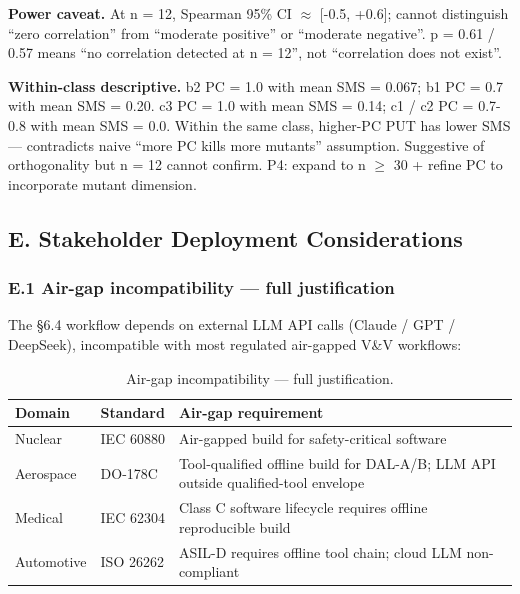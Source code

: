 \documentclass[review,12pt,authoryear]{elsarticle}
\begin{document}
\textbf{Power caveat.} At n = 12, Spearman 95\% CI $\approx$ {[}-0.5, +0.6{]};
cannot distinguish ``zero correlation'' from ``moderate positive'' or
``moderate negative''. p = 0.61 / 0.57 means ``no correlation detected
at n = 12'', not ``correlation does not exist''.

\textbf{Within-class descriptive.} b2 PC = 1.0 with mean SMS = 0.067; b1
PC = 0.7 with mean SMS = 0.20. c3 PC = 1.0 with mean SMS = 0.14; c1 / c2
PC = 0.7-0.8 with mean SMS = 0.0. Within the same class, higher-PC PUT
has lower SMS --- contradicts naive ``more PC kills more mutants''
assumption. Suggestive of orthogonality but n = 12 cannot confirm. P4:
expand to n $\geq$ 30 + refine PC to incorporate mutant dimension.


\subsection{E. Stakeholder Deployment Considerations}\label{e.-stakeholder-deployment-considerations-single-output-kernels-scope}

\subsubsection{E.1 Air-gap incompatibility --- full justification}\label{e.1-air-gap-incompatibility-full-justification}

The §6.4 workflow depends on external LLM API calls (Claude / GPT /
DeepSeek), incompatible with most regulated air-gapped V\&V workflows:

{\def\LTcaptype{table} %
\begin{longtable}[]{@{}
  >{\raggedright\arraybackslash}p{}
  >{\raggedright\arraybackslash}p{}
  >{\raggedright\arraybackslash}p{}@{}}
\caption{Air-gap incompatibility --- full justification.}\label{tab:p2-25}\\
\toprule\noalign{}
\begin{minipage}[b]{\linewidth}\raggedright
Domain
\end{minipage} & \begin{minipage}[b]{\linewidth}\raggedright
Standard
\end{minipage} & \begin{minipage}[b]{\linewidth}\raggedright
Air-gap requirement
\end{minipage} \\
\midrule\noalign{}
\endhead
\bottomrule\noalign{}
\endlastfoot
Nuclear & IEC 60880 & Air-gapped build for safety-critical software \\
Aerospace & DO-178C & Tool-qualified offline build for DAL-A/B; LLM API
outside qualified-tool envelope \\
Medical & IEC 62304 & Class C software lifecycle requires offline
reproducible build \\
Automotive & ISO 26262 & ASIL-D requires offline tool chain; cloud LLM
non-compliant \\
\end{longtable}
}
\end{document}

